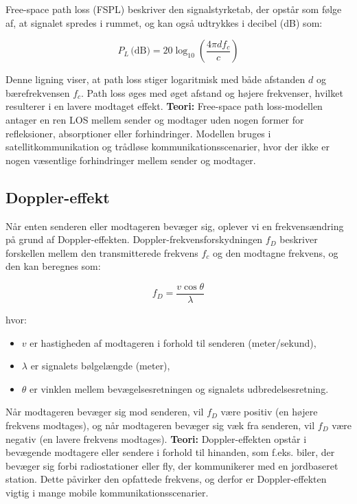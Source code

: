 \documentclass[a4paper,12pt]{book}
\begin{document}
	Free-space path loss (FSPL) beskriver den signalstyrketab, der opstår som følge af, at signalet spredes i rummet, og kan også udtrykkes i decibel (dB) som:
	
	\[
	P_L \, \text{(dB)} = 20 \log_{10} \left( \frac{4\pi d f_c}{c} \right)
	\]
	
	Denne ligning viser, at path loss stiger logaritmisk med både afstanden \( d \) og bærefrekvensen \( f_c \). Path loss øges med øget afstand og højere frekvenser, hvilket resulterer i en lavere modtaget effekt.
	\newline\newline\noindent
	\textbf{Teori:}
	Free-space path loss-modellen antager en ren LOS mellem sender og modtager uden nogen former for refleksioner, absorptioner eller forhindringer. Modellen bruges i satellitkommunikation og trådløse kommunikationsscenarier, hvor der ikke er nogen væsentlige forhindringer mellem sender og modtager.
	
	\subsection{Doppler-effekt}
	Når enten senderen eller modtageren bevæger sig, oplever vi en frekvensændring på grund af Doppler-effekten. Doppler-frekvensforskydningen \( f_D \) beskriver forskellen mellem den transmitterede frekvens \( f_c \) og den modtagne frekvens, og den kan beregnes som:
	
	\[
	f_D = \frac{v \cos \theta}{\lambda}
	\]
	
	hvor:
	\begin{itemize}
		\item \( v \) er hastigheden af modtageren i forhold til senderen (meter/sekund),
		\item \( \lambda \) er signalets bølgelængde (meter),
		\item \( \theta \) er vinklen mellem bevægelsesretningen og signalets udbredelsesretning.
	\end{itemize}
	
	\noindent Når modtageren bevæger sig mod senderen, vil \( f_D \) være positiv (en højere frekvens modtages), og når modtageren bevæger sig væk fra senderen, vil \( f_D \) være negativ (en lavere frekvens modtages).
	\newline\newline\noindent
	\textbf{Teori:}
	Doppler-effekten opstår i bevægende modtagere eller sendere i forhold til hinanden, som f.eks. biler, der bevæger sig forbi radiostationer eller fly, der kommunikerer med en jordbaseret station. Dette påvirker den opfattede frekvens, og derfor er Doppler-effekten vigtig i mange mobile kommunikationsscenarier.
	
\end{document}
